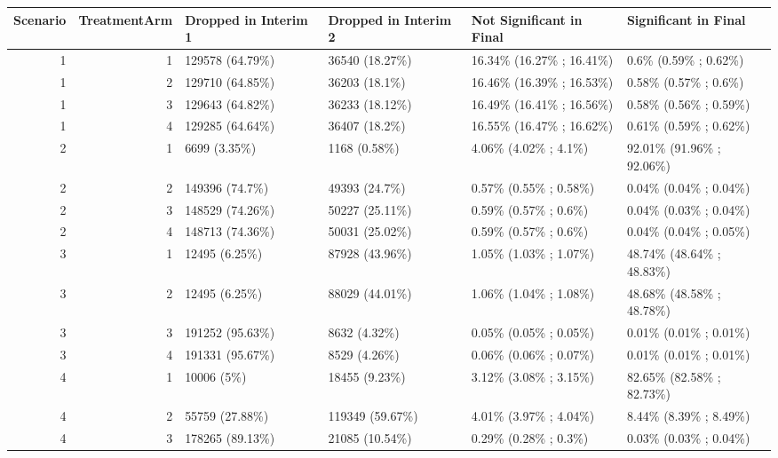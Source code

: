 \documentclass[11pt, a4paper]{article}\usepackage[]{graphicx}\usepackage[]{xcolor}
\begin{document}
\begin{landscape}
\begin{table}[ht]
\centering
\begin{tabular}{rrllll}
  \hline
Scenario & TreatmentArm & Dropped in Interim 1 & Dropped in Interim 2 & Not Significant in Final & Significant in Final \\ 
  \hline
  1 &   1 & 129578 (64.79\%) & 36540 (18.27\%) & 16.34\% (16.27\% ; 16.41\%) & 0.6\% (0.59\% ; 0.62\%) \\ 
    1 &   2 & 129710 (64.85\%) & 36203 (18.1\%) & 16.46\% (16.39\% ; 16.53\%) & 0.58\% (0.57\% ; 0.6\%) \\ 
    1 &   3 & 129643 (64.82\%) & 36233 (18.12\%) & 16.49\% (16.41\% ; 16.56\%) & 0.58\% (0.56\% ; 0.59\%) \\ 
    1 &   4 & 129285 (64.64\%) & 36407 (18.2\%) & 16.55\% (16.47\% ; 16.62\%) & 0.61\% (0.59\% ; 0.62\%) \\ 
   \hline 
  2 &   1 & 6699 (3.35\%) & 1168 (0.58\%) & 4.06\% (4.02\% ; 4.1\%) & 92.01\% (91.96\% ; 92.06\%) \\ 
    2 &   2 & 149396 (74.7\%) & 49393 (24.7\%) & 0.57\% (0.55\% ; 0.58\%) & 0.04\% (0.04\% ; 0.04\%) \\ 
    2 &   3 & 148529 (74.26\%) & 50227 (25.11\%) & 0.59\% (0.57\% ; 0.6\%) & 0.04\% (0.03\% ; 0.04\%) \\ 
    2 &   4 & 148713 (74.36\%) & 50031 (25.02\%) & 0.59\% (0.57\% ; 0.6\%) & 0.04\% (0.04\% ; 0.05\%) \\ 
   \hline 
  3 &   1 & 12495 (6.25\%) & 87928 (43.96\%) & 1.05\% (1.03\% ; 1.07\%) & 48.74\% (48.64\% ; 48.83\%) \\ 
    3 &   2 & 12495 (6.25\%) & 88029 (44.01\%) & 1.06\% (1.04\% ; 1.08\%) & 48.68\% (48.58\% ; 48.78\%) \\ 
    3 &   3 & 191252 (95.63\%) & 8632 (4.32\%) & 0.05\% (0.05\% ; 0.05\%) & 0.01\% (0.01\% ; 0.01\%) \\ 
    3 &   4 & 191331 (95.67\%) & 8529 (4.26\%) & 0.06\% (0.06\% ; 0.07\%) & 0.01\% (0.01\% ; 0.01\%) \\ 
   \hline 
  4 &   1 & 10006 (5\%) & 18455 (9.23\%) & 3.12\% (3.08\% ; 3.15\%) & 82.65\% (82.58\% ; 82.73\%) \\ 
    4 &   2 & 55759 (27.88\%) & 119349 (59.67\%) & 4.01\% (3.97\% ; 4.04\%) & 8.44\% (8.39\% ; 8.49\%) \\ 
    4 &   3 & 178265 (89.13\%) & 21085 (10.54\%) & 0.29\% (0.28\% ; 0.3\%) & 0.03\% (0.03\% ; 0.04\%) \\ 

\end{tabular}
\end{table}
\end{landscape}
\end{document}

